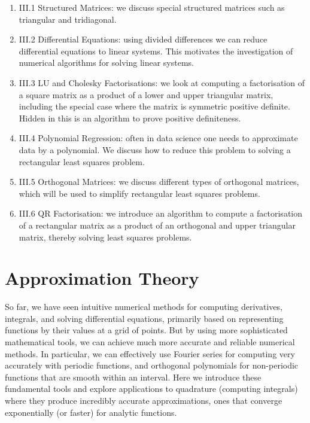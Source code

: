 \documentclass[12pt,a4paper]{book}
\theoremstyle{definition}
\begin{document}
\begin{enumerate}
    \item III.1 Structured Matrices: we discuss special structured matrices such as triangular and tridiagonal.
    \item III.2 Differential Equations: using divided differences we can reduce differential equations
    to linear systems. This motivates the investigation of numerical algorithms for solving linear systems.
    \item III.3 LU and Cholesky Factorisations: we look at computing a factorisation of a square matrix as a product of a lower and upper triangular matrix, including the special case where the matrix is symmetric positive
    definite. Hidden in this is an algorithm to prove positive definiteness.
\item III.4 Polynomial Regression: often in data science one needs to approximate data by a polynomial.
We discuss how to reduce this problem to solving a rectangular least squares problem.
\item III.5 Orthogonal Matrices: we discuss different types of orthogonal matrices, which will be used to simplify rectangular least squares problems.
\item III.6 QR Factorisation: we introduce an algorithm to compute a factorisation of a rectangular matrix as a product of an orthogonal and upper triangular matrix, thereby solving least squares problems.
\end{enumerate}









\chapter{Approximation Theory}

So far, we have seen intuitive numerical methods for computing derivatives, integrals, and solving
differential equations, primarily based on representing functions by their values at a grid of points.
But by using more sophisticated mathematical tools, we can achieve much more accurate and reliable
numerical methods. In particular, we can effectively use Fourier series for computing very accurately with periodic functions,
and orthogonal polynomials for non-periodic functions that are smooth within an interval.
Here we introduce these fundamental tools and explore applications to quadrature (computing integrals) where they
produce incredibly accurate approximations, ones that converge exponentially (or faster) for analytic functions.
\end{document}
